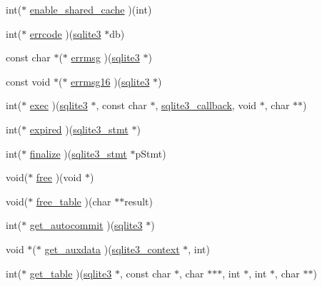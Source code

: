 \begin{DoxyCompactItemize}
\item 
int($\ast$ \hyperlink{structsqlite3__api__routines_ae67da9e0a3629fd1fd46fd73389d8c98}{enable\+\_\+shared\+\_\+cache} )(int)
\item 
int($\ast$ \hyperlink{structsqlite3__api__routines_a1a985d959eafe6f293e41a5ca1d1a2e9}{errcode} )(\hyperlink{sqlite3_8h_a0ef6f2646262c8a9b24368d8ac140f69}{sqlite3} $\ast$db)
\item 
const char $\ast$($\ast$ \hyperlink{structsqlite3__api__routines_a69002673143895d276850a400e7955d7}{errmsg} )(\hyperlink{sqlite3_8h_a0ef6f2646262c8a9b24368d8ac140f69}{sqlite3} $\ast$)
\item 
const void $\ast$($\ast$ \hyperlink{structsqlite3__api__routines_a1392e153c69f5b32fd8acc19cb780baf}{errmsg16} )(\hyperlink{sqlite3_8h_a0ef6f2646262c8a9b24368d8ac140f69}{sqlite3} $\ast$)
\item 
int($\ast$ \hyperlink{structsqlite3__api__routines_ac6476ec4fd66eb629942bd60a47adf76}{exec} )(\hyperlink{sqlite3_8h_a0ef6f2646262c8a9b24368d8ac140f69}{sqlite3} $\ast$, const char $\ast$, \hyperlink{sqlite3_8h_aede337a366367e94a52d849482967ddd}{sqlite3\+\_\+callback}, void $\ast$, char $\ast$$\ast$)
\item 
int($\ast$ \hyperlink{structsqlite3__api__routines_aaf5ef34c7b325eefb8459224a5c926e8}{expired} )(\hyperlink{sqlite3_8h_af2a033da1327cdd77f0a174a09aedd0c}{sqlite3\+\_\+stmt} $\ast$)
\item 
int($\ast$ \hyperlink{structsqlite3__api__routines_a0bbe0b1cdd61a2e7e089ad1e42978f6f}{finalize} )(\hyperlink{sqlite3_8h_af2a033da1327cdd77f0a174a09aedd0c}{sqlite3\+\_\+stmt} $\ast$p\+Stmt)
\item 
void($\ast$ \hyperlink{structsqlite3__api__routines_a7418560cd2dacb9a6cb0b7f5e3082787}{free} )(void $\ast$)
\item 
void($\ast$ \hyperlink{structsqlite3__api__routines_aa94faa431905ee9d04bb93cbce735a0c}{free\+\_\+table} )(char $\ast$$\ast$result)
\item 
int($\ast$ \hyperlink{structsqlite3__api__routines_ae37e25adf7b17f97387fa1ac36094988}{get\+\_\+autocommit} )(\hyperlink{sqlite3_8h_a0ef6f2646262c8a9b24368d8ac140f69}{sqlite3} $\ast$)
\item 
void $\ast$($\ast$ \hyperlink{structsqlite3__api__routines_a1be39621e5074afbd0a81f105105866e}{get\+\_\+auxdata} )(\hyperlink{sqlite3_8h_a3b519553ffec8fc42b2356f5b1ebdc57}{sqlite3\+\_\+context} $\ast$, int)
\item 
int($\ast$ \hyperlink{structsqlite3__api__routines_a3a265a9fa59237ed1630acf4b4f5efc4}{get\+\_\+table} )(\hyperlink{sqlite3_8h_a0ef6f2646262c8a9b24368d8ac140f69}{sqlite3} $\ast$, const char $\ast$, char $\ast$$\ast$$\ast$, int $\ast$, int $\ast$, char $\ast$$\ast$)
$$
\end{DoxyCompactItemize}
